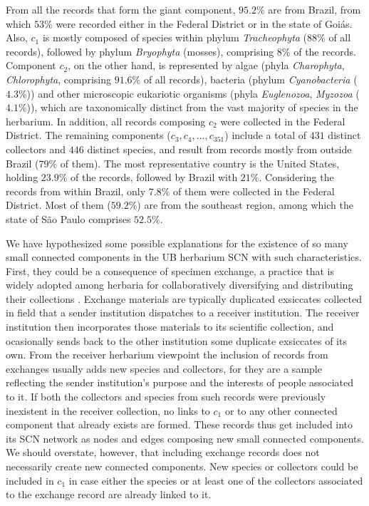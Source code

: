 From all the records that form the giant component, $95.2\%$ are from Brazil, from which $53\%$ were recorded either in the Federal District or in the state of Goiás. 
Also, $c_1$ is mostly composed of species within phylum \textit{Tracheophyta} ($88\%$ of all records), followed by phylum \textit{Bryophyta} (mosses), comprising $8\%$ of the records. 
Component $c_2$, on the other hand, is represented by algae (phyla \textit{Charophyta}, \textit{Chlorophyta}, comprising $91.6\%$ of all records), bacteria (phylum \textit{Cyanobacteria} ($4.3\%$)) and other microscopic eukariotic organisms (phyla \textit{Euglenozoa}, \textit{Myzozoa} ($4.1\%$)), which are taxonomically distinct from the vast majority of species in the herbarium.
In addition, all records composing $c_2$ were collected in the Federal District.
The remaining components ($c_3,c_4,..., c_{351}$) include a total of $431$ distinct collectors and $446$ distinct species, and result from records mostly from outside Brazil ($79\%$ of them).
The most representative country is the United States, holding $23.9\%$ of the records, followed by Brazil with $21\%$. 
Considering the records from within Brazil, only $7.8\%$ of them were collected in the Federal District. Most of them ($59.2\%$) are from the southeast region, among which the state of São Paulo comprises $52.5\%$.

We have hypothesized some possible explanations for the existence of so many small connected components in the UB herbarium SCN with such characteristics. First, they could be a consequence of specimen exchange, a practice that is widely adopted among herbaria for collaboratively diversifying and distributing their collections \cite{Groom2014}. Exchange materials are typically duplicated exsiccates collected in field that a sender institution dispatches to a receiver institution. The receiver institution then incorporates those materials to its scientific collection, and ocasionally sends back to the other institution some duplicate exsiccates of its own.
From the receiver herbarium viewpoint the inclusion of records from exchanges usually adds new species and collectors, for they are a sample reflecting the sender institution's purpose and the interests of people associated to it. If both the collectors and species from such records were previously inexistent in the receiver collection, no links to $c_1$ or to any other connected component that already exists are formed. These records thus get included into its SCN network as nodes and edges composing new small connected components. We should overstate, however, that including exchange records does not necessarily create new connected components. New species or collectors could be included in $c_1$ in case either the species or at least one of the collectors associated to the exchange record are already linked to it.

